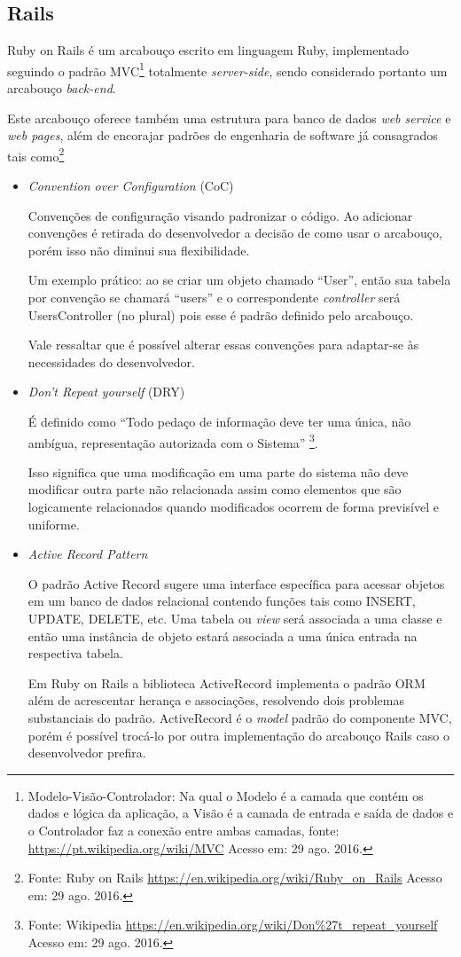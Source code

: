 \subsection{Rails}
\par Ruby on Rails é um arcabouço escrito em linguagem Ruby, implementado seguindo o padrão MVC\footnote{Modelo-Visão-Controlador: Na qual o Modelo é a camada que contém os dados e lógica da aplicação, a Visão é a camada de entrada e saída de dados e o Controlador faz a conexão entre ambas camadas, fonte: \url{https://pt.wikipedia.org/wiki/MVC} Acesso em: 29 ago. 2016.} totalmente \emph{server-side}, sendo considerado portanto um arcabouço \emph{back-end}.
\par Este arcabouço oferece também uma estrutura para banco de dados \emph{web service} e \emph{web pages}, além de encorajar padrões de engenharia de software já consagrados tais como\footnote{Fonte: Ruby on Rails \url{https://en.wikipedia.org/wiki/Ruby_on_Rails} Acesso em: 29 ago. 2016.}
\begin{itemize}
\item {\emph{Convention over Configuration} (CoC)}
    \par Convenções de configuração visando padronizar o código. Ao adicionar convenções é retirada do desenvolvedor a decisão de como usar o arcabouço, porém isso não diminui sua flexibilidade. 
    \par Um exemplo prático: ao se criar um objeto chamado ``User'', então sua tabela por convenção se chamará ``users'' e o correspondente \emph{controller} será UsersController (no plural) pois esse é padrão definido pelo arcabouço.
    \par Vale ressaltar que é possível alterar essas convenções para adaptar-se às necessidades do desenvolvedor.

\item {\emph{Don't Repeat yourself} (DRY)}
    \par É definido como ``Todo pedaço de informação deve ter uma única, não ambígua, representação autorizada com o Sistema'' \footnote{Fonte: Wikipedia \url{https://en.wikipedia.org/wiki/Don\%27t_repeat_yourself} Acesso em: 29 ago. 2016.}.
    \par Isso significa que uma modificação em uma parte do sistema não deve modificar outra parte não relacionada assim como elementos que são logicamente relacionados quando modificados ocorrem de forma previsível e uniforme.

\item { \emph{Active Record Pattern}}
    \par O padrão Active Record sugere uma interface específica para acessar objetos em um banco de dados relacional contendo funções tais como INSERT, UPDATE, DELETE, etc. Uma tabela ou \emph{view} será associada a uma classe e então uma instância de objeto estará associada a uma única entrada na respectiva tabela.
    \par Em Ruby on Rails a biblioteca ActiveRecord implementa o padrão ORM além de acrescentar herança e associações, resolvendo dois problemas substanciais do padrão. ActiveRecord é o \emph{model} padrão do componente MVC, porém é possível trocá-lo por outra implementação do arcabouço Rails caso o desenvolvedor prefira.
\end{itemize}
